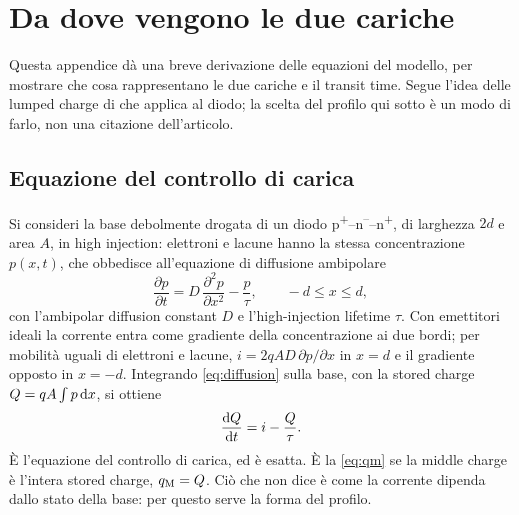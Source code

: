 \documentclass[10pt,a4paper]{scrartcl}
\let\newcommand\lmitdefine
\newcommand{\qM}{q_\mathrm{M}}
\newcommand{\diff}{\mathrm{d}}
\begin{document}
\appendix
\section{Da dove vengono le due cariche}
\label{app:lumped}
Questa appendice dà una breve derivazione delle equazioni del modello, per mostrare che cosa rappresentano le due cariche e il transit time. Segue l'idea delle lumped charge di \cite{linvill1958} che \cite{lauritzen1991} applica al diodo; la scelta del profilo qui sotto è un modo di farlo, non una citazione dell'articolo.

\subsection*{Equazione del controllo di carica}
Si consideri la base debolmente drogata di un diodo p\textsuperscript{+}--n\textsuperscript{--}--n\textsuperscript{+}, di larghezza $2d$ e area $A$, in high injection: elettroni e lacune hanno la stessa concentrazione $p(x,t)$, che obbedisce all'equazione di diffusione ambipolare
\begin{equation}
\frac{\partial p}{\partial t} = D\,\frac{\partial^2 p}{\partial x^2} - \frac{p}{\tau} , \qquad -d \leq x \leq d ,
\label{eq:diffusion}
\end{equation}
con l'ambipolar diffusion constant $D$ e l'high-injection lifetime $\tau$. Con emettitori ideali la corrente entra come gradiente della concentrazione ai due bordi; per mobilità uguali di elettroni e lacune, $i = 2qAD\,\partial p/\partial x$ in $x = d$ e il gradiente opposto in $x = -d$. Integrando \eqref{eq:diffusion} sulla base, con la stored charge $Q = qA\int p\,\diff x$, si ottiene
\begin{equation}
\frac{\diff Q}{\diff t} = i - \frac{Q}{\tau} .
\label{eq:cc}
\end{equation}
È l'equazione del controllo di carica, ed è esatta. È la \eqref{eq:qm} se la middle charge è l'intera stored charge, $\qM = Q$. Ciò che non dice è come la corrente dipenda dallo stato della base: per questo serve la forma del profilo.
\end{document}
